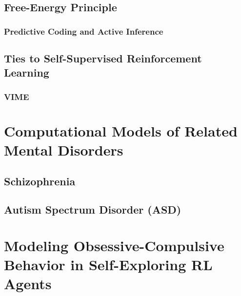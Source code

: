 \documentclass[aspectratio=169,xcolor=dvipsnames]{beamer}
\begin{document}
\subsection{Free-Energy Principle}
\subsubsection{Predictive Coding and Active Inference}

\subsection{Ties to Self-Supervised Reinforcement Learning}

\subsubsection{VIME}


\section{Computational Models of Related Mental Disorders}
\subsection{Schizophrenia}

\subsection{Autism Spectrum Disorder (ASD)}


\section{Modeling Obsessive-Compulsive Behavior in Self-Exploring RL Agents} %
\end{document}
